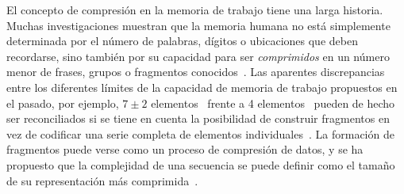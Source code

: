 
El concepto de compresión en la memoria de trabajo tiene una larga historia. Muchas investigaciones muestran que la memoria humana no está simplemente determinada por el número de palabras, dígitos o ubicaciones que deben recordarse, sino también por su capacidad para ser \textit{comprimidos} en un número menor de frases, grupos o fragmentos conocidos~\cite{f23,f24,f25,f26,feldman2000minimization,f28,f29}. Las aparentes discrepancias entre los diferentes límites de la capacidad de memoria de trabajo propuestos en el pasado, por ejemplo, $7\pm 2$ elementos~\cite{f29} frente a 4 elementos~\cite{f25,f30} pueden de hecho ser reconciliados si se tiene en cuenta la posibilidad de construir fragmentos en vez de codificar una serie completa de elementos individuales~\cite{f16,f31}. La formación de fragmentos puede verse como un proceso de compresión de datos, y se ha propuesto que la complejidad de una secuencia se puede definir como el tamaño de su representación más comprimida~\cite{f16,f32,f33,f34}.


